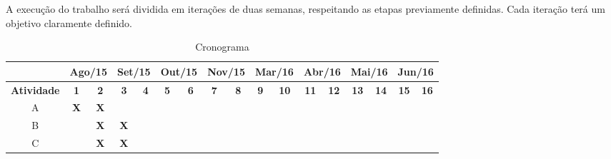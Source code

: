 A execução do trabalho será dividida em iterações de duas semanas, respeitando
as etapas previamente definidas. Cada iteração terá um objetivo claramente
definido.

\begin{table}[htb!]
\centering
\caption{Cronograma}
\label{tab:cronograma}
\begin{tabular}{c|c|c|c|c|c|c|c|c|c|c|c|c|c|c|c|c|}
\cline{2-17}
{\bf }                                & \multicolumn{2}{c|}{{\bf Ago/15}}             & \multicolumn{2}{c|}{{\bf Set/15}}             & \multicolumn{2}{c|}{{\bf Out/15}}             & \multicolumn{2}{c|}{{\bf Nov/15}}             & \multicolumn{2}{c|}{{\bf Mar/16}}             & \multicolumn{2}{c|}{{\bf Abr/16}} & \multicolumn{2}{c|}{{\bf Mai/16}} & \multicolumn{2}{c|}{{\bf Jun/16}} \\ \hline
\multicolumn{1}{|c|}{{\bf Atividade}} & {\bf 1}               & {\bf 2}               & {\bf 3}               & {\bf 4}               & {\bf 5}               & {\bf 6}               & {\bf 7}               & {\bf 8}               & {\bf 9}               & {\bf 10}              & {\bf 11}        & {\bf 12}        & {\bf 13}        & {\bf 14}        & {\bf 15}        & {\bf 16}        \\ \hline
\multicolumn{1}{|c|}{A}               & {\bf X}               & {\bf X}               & {\bf }                & {\bf }                & {\bf }                & {\bf }                & {\bf }                & {\bf }                & {\bf }                & {\bf }                & {\bf }          & {\bf }          & {\bf \it }      & {\bf \it }      & {\bf \it }      & {\bf \it }      \\ \hline
\multicolumn{1}{|c|}{B}               & {\bf }                & {\bf X}               & {\bf X}               & {\bf }                & {\bf }                & {\bf }                & {\bf }                & {\bf }                & {\bf }                & {\bf }                & {\bf }          & {\bf }          & {\bf \it }      & {\bf \it }      & {\bf \it }      & {\bf \it }      \\ \hline
\multicolumn{1}{|c|}{C}               & {\bf }                & {\bf X}               & {\bf X}               & {\bf }                & {\bf }                & {\bf }                & {\bf }                & {\bf }                & {\bf }                & {\bf }                & {\bf }          & {\bf }          & {\bf \it }      & {\bf \it }      & {\bf \it }      & {\bf \it }      \\ \hline

\end{tabular}
\end{table}
